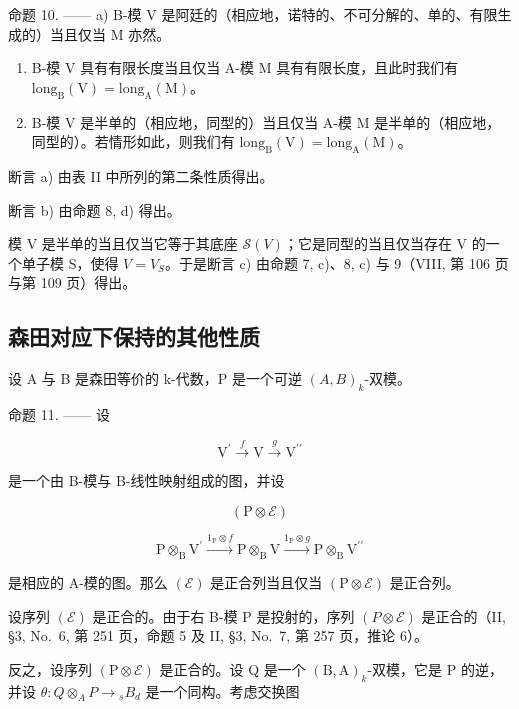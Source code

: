 命题 10. —— a) B-模 V 是阿廷的（相应地，诺特的、不可分解的、单的、有限生成的）当且仅当 M 亦然。

\begin{enumerate}
\def\labelenumi{\alph{enumi})}
\setcounter{enumi}{1}
\item
  B-模 V 具有有限长度当且仅当 A-模 M 具有有限长度，且此时我们有 \(\mathrm{long}_{\mathrm{B}}(\mathrm{V}) = \mathrm{long}_{\mathrm{A}}(\mathrm{M})\)。
\item
  B-模 V 是半单的（相应地，同型的）当且仅当 A-模 M 是半单的（相应地，同型的）。若情形如此，则我们有 \(\text{long}_{\text{B}}(\text{V}) = \text{long}_{\text{A}}(\text{M})\)。
\end{enumerate}

断言 a) 由表 II 中所列的第二条性质得出。

断言 b) 由命题 8, d) 得出。

模 V 是半单的当且仅当它等于其底座 \(\mathcal{S}(V)\)；它是同型的当且仅当存在 V 的一个单子模 S，使得 \(V = V_{S}\)。于是断言 c) 由命题 7, c)、8, c) 与 9（VIII, 第 106 页与第 109 页）得出。

\subsection{森田对应下保持的其他性质}

设 A 与 B 是森田等价的 k-代数，P 是一个可逆 \((A,B)_{k}\)-双模。

命题 11. —— 设

\[
\mathrm{V} ^ {\prime} \xrightarrow {f} \mathrm{V} \xrightarrow {g} \mathrm{V} ^ {\prime \prime}\tag{ε}
\]

是一个由 B-模与 B-线性映射组成的图，并设

\[
(\mathrm{P} \otimes \mathcal {E})
\]

\[
\mathrm{P} \otimes_ {\mathrm{B}} \mathrm{V} ^ {\prime} \xrightarrow {1 _ {\mathrm{P}} \otimes f} \mathrm{P} \otimes_ {\mathrm{B}} \mathrm{V} \xrightarrow {1 _ {\mathrm{P}} \otimes g} \mathrm{P} \otimes_ {\mathrm{B}} \mathrm{V} ^ {\prime \prime}
\]

是相应的 A-模的图。那么 \((\mathcal{E})\) 是正合列当且仅当 \((\mathrm{P} \otimes \mathcal{E})\) 是正合列。

设序列 \((\mathcal{E})\) 是正合的。由于右 B-模 P 是投射的，序列 \((P \otimes \mathcal{E})\) 是正合的（II, §3, No.~6, 第 251 页，命题 5 及 II, §3, No.~7, 第 257 页，推论 6）。

反之，设序列 \((\mathrm{P} \otimes \mathcal{E})\) 是正合的。设 Q 是一个 \((\mathrm{B}, \mathrm{A})_{k}\)-双模，它是 P 的逆，并设 \(\theta : Q \otimes_{A} P \to {}_{s} B_{d}\) 是一个同构。考虑交换图

